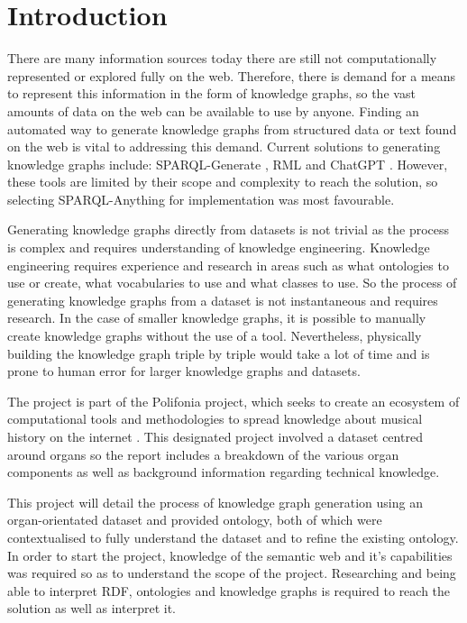 \chapter{Introduction}
There are many information sources today there are still not computationally represented or explored fully on the web. Therefore, there is demand for a means to represent this information in the form of knowledge graphs, so the vast amounts of data on the web can be available to use by anyone. Finding an automated way to generate knowledge graphs from structured data or text found on the web is vital to addressing this demand. Current solutions to generating knowledge graphs include: SPARQL-Generate \cite{sparqlgenerate}, RML \cite{rml} and ChatGPT \cite{chatgptwebsite}. However, these tools are limited by their scope and complexity to reach the solution, so selecting SPARQL-Anything \cite{sparqlanythinggithub} for implementation was most favourable. 

Generating knowledge graphs directly from datasets is not trivial as the process is complex and requires understanding of knowledge engineering. Knowledge engineering requires experience and research in areas such as what ontologies to use or create, what vocabularies to use and what classes to use. So the process of generating knowledge graphs from a dataset is not instantaneous and requires research. In the case of smaller knowledge graphs, it is possible to manually create knowledge graphs without the use of a tool. Nevertheless, physically building the knowledge graph triple by triple would take a lot of time and is prone to human error for larger knowledge graphs and datasets. 

The project is part of the Polifonia project, which seeks to create an ecosystem of computational tools and methodologies to spread knowledge about musical history on the internet \cite{polifoniaproject}. This designated project involved a dataset centred around organs so the report includes a breakdown of the various organ components as well as background information regarding technical knowledge. 

This project will detail the process of knowledge graph generation using an organ-orientated dataset and provided ontology, both of which were contextualised to fully understand the dataset and to refine the existing ontology. In order to start the project, knowledge of the semantic web and it's capabilities was required so as to understand the scope of the project. Researching and being able to interpret RDF, ontologies and knowledge graphs is required to reach the solution as well as interpret it. 

